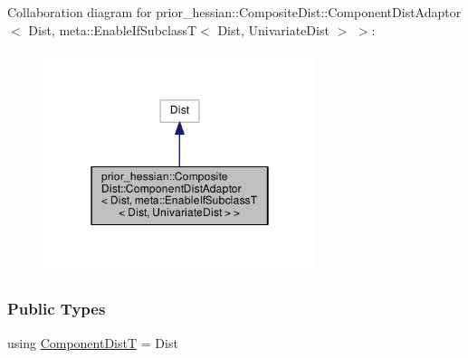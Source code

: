 Collaboration diagram for prior\+\_\+hessian\+:\+:Composite\+Dist\+:\+:Component\+Dist\+Adaptor$<$ Dist, meta\+:\+:Enable\+If\+SubclassT$<$ Dist, Univariate\+Dist $>$ $>$\+:\nopagebreak
\begin{figure}[H]
\begin{center}
\leavevmode
\includegraphics[width=226pt]{classprior__hessian_1_1CompositeDist_1_1ComponentDistAdaptor_3_01Dist_00_01meta_1_1EnableIfSubcl002169c485ab06a350b7013021fb1e48}
\end{center}
\end{figure}
\subsubsection*{Public Types}
\begin{DoxyCompactItemize}
\item 
using \hyperlink{classprior__hessian_1_1CompositeDist_1_1ComponentDistAdaptor_3_01Dist_00_01meta_1_1EnableIfSubclc6c9bd83bba546a81e521c87ad7ee6d3_a6d5b023ff7f6ddc9ab9ba24ab24f2b4e}{Component\+DistT} = Dist
\end{DoxyCompactItemize}
